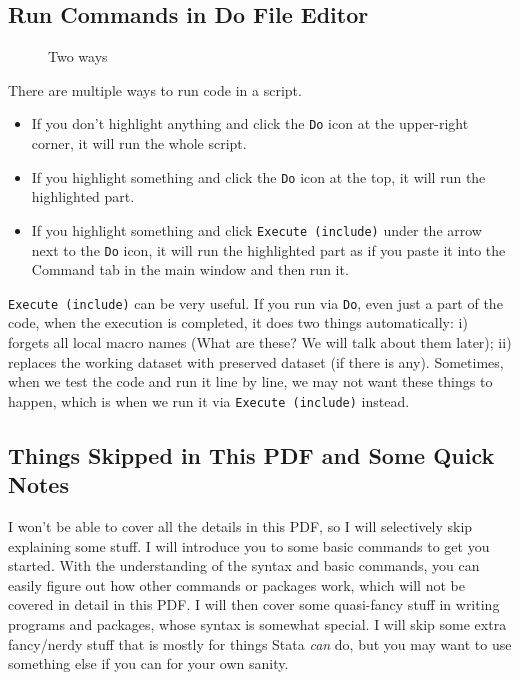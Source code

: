 \subsection{Run Commands in Do File Editor}
\label{sec_run_commands}
\begin{figure}[H]
    \centering
    \caption{Two ways}
    \hspace{3cm}
\end{figure}
There are multiple ways to run code in a script.
\begin{itemize}
    \item If you don't highlight anything and click the \verb|Do| icon at the upper-right corner, it will run the whole script. 
    \item If you highlight something and click the \verb|Do| icon at the top, it will run the highlighted part. 
    \item If you highlight something and click \verb|Execute (include)| under the arrow next to the \verb|Do| icon, it will run the highlighted part as if you paste it into the Command tab in the main window and then run it. 
\end{itemize}
\verb|Execute (include)| can be very useful. If you run via \verb|Do|, even just a part of the code, when the execution is completed, it does two things automatically: i) forgets all local macro names (What are these? We will talk about them later); ii)  replaces the working dataset with preserved dataset (if there is any). Sometimes, when we test the code and run it line by line, we may not want these things to happen, which is when we run it via \verb|Execute (include)| instead. 

\subsection{Things Skipped in This PDF and Some Quick Notes}
I won't be able to cover all the details in this PDF, so I will selectively skip explaining some stuff. I will introduce you to some basic commands to get you started. With the understanding of the syntax and basic commands, you can easily figure out how other commands or packages work, which will not be covered in detail in this PDF. I will then cover some quasi-fancy stuff in writing programs and packages, whose syntax is somewhat special. I will skip some extra fancy/nerdy stuff that is mostly for things Stata \textit{can} do, but you may want to use something else if you can for your own sanity. 

